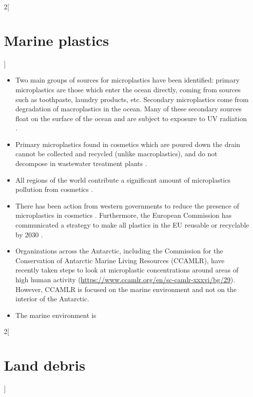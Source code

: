 \documentclass{article}
\begin{document}
\begin{multicols}{2}[
    \section{Marine plastics}
]
\begin{itemize}
    \item Two main groups of sources for microplastics have been identified: primary microplastics are those which enter the ocean directly, coming from sources such as toothpaste, laundry products, etc. Secondary microplastics come from degradation of macroplastics in the ocean. Many of these secondary sources float on the surface of the ocean and are subject to exposure to UV radiation \cite{microplastics2017}.
    
    \item Primary microplastics found in cosmetics which are poured down the drain cannot be collected and recycled (unlike macroplastics), and do not decompose in wastewater treatment plants \cite{unepcosmetics2015}.
    
    \item All regions of the world contribute a significant amount of microplastics pollution from cosmetics \cite{pmpsinoceans2017}.
    
    \item There has been action from western governments to reduce the presence of microplastics in cosmetics \cite{mpsincosmetics2019}. Furthermore, the European Commission has communicated a strategy to make all plastics in the EU reusable or recyclable by 2030 \cite{ecplastics2018}.
    
    \item Organizations across the Antarctic, including the Commission for the Conservation of Antarctic Marine Living Resources (CCAMLR), have recently taken steps to look at microplastic concentrations around areas of high human activity (\url{https://www.ccamlr.org/en/sc-camlr-xxxvi/bg/29}). However, CCAMLR is focused on the marine environment and not on the interior of the Antarctic.
    
    \item The marine environment is 
\end{itemize}
\end{multicols}

\begin{multicols}{2}[
    \section{Land debris}
]
\end{multicols}
\end{document}
